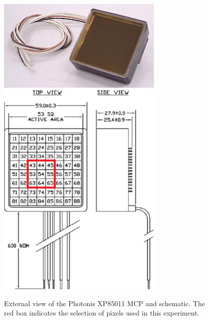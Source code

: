 \documentclass[twocolumn]{article}
\begin{document}
\begin{figure}[htbp]
	\centering
	\includegraphics[width=8cm]{Images/photonis/photonis.jpg}
	\includegraphics[width=8cm]{Images/photonis/photonis2.png}
	\caption{\small External view of the Photonis XP85011 MCP and schematic. The red box indicates the selection of pixels used in this experiment.}
	\label{fig:photonis}
\end{figure}
\end{document}
